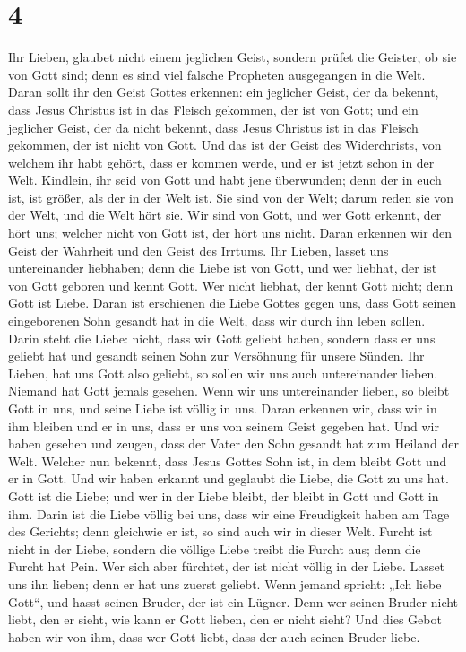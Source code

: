 \hypertarget{section-3}{%
\section{4}\label{section-3}}

 Ihr Lieben, glaubet nicht einem jeglichen Geist, sondern
prüfet die Geister, ob sie von Gott sind; denn es sind viel falsche
Propheten ausgegangen in die Welt.  Daran sollt ihr den
Geist Gottes erkennen: ein jeglicher Geist, der da bekennt, dass Jesus
Christus ist in das Fleisch gekommen, der ist von Gott; 
und ein jeglicher Geist, der da nicht bekennt, dass Jesus Christus ist
in das Fleisch gekommen, der ist nicht von Gott. Und das ist der Geist
des Widerchrists, von welchem ihr habt gehört, dass er kommen werde, und
er ist jetzt schon in der Welt.  Kindlein, ihr seid von
Gott und habt jene überwunden; denn der in euch ist, ist größer, als der
in der Welt ist.  Sie sind von der Welt; darum reden sie
von der Welt, und die Welt hört sie.  Wir sind von Gott,
und wer Gott erkennt, der hört uns; welcher nicht von Gott ist, der hört
uns nicht. Daran erkennen wir den Geist der Wahrheit und den Geist des
Irrtums.  Ihr Lieben, lasset uns untereinander liebhaben;
denn die Liebe ist von Gott, und wer liebhat, der ist von Gott geboren
und kennt Gott.  Wer nicht liebhat, der kennt Gott nicht;
denn Gott ist Liebe.  Daran ist erschienen die Liebe
Gottes gegen uns, dass Gott seinen eingeborenen Sohn gesandt hat in die
Welt, dass wir durch ihn leben sollen.  Darin steht die
Liebe: nicht, dass wir Gott geliebt haben, sondern dass er uns geliebt
hat und gesandt seinen Sohn zur Versöhnung für unsere Sünden.
 Ihr Lieben, hat uns Gott also geliebt, so sollen wir uns
auch untereinander lieben.  Niemand hat Gott jemals
gesehen. Wenn wir uns untereinander lieben, so bleibt Gott in uns, und
seine Liebe ist völlig in uns.  Daran erkennen wir, dass
wir in ihm bleiben und er in uns, dass er uns von seinem Geist gegeben
hat.  Und wir haben gesehen und zeugen, dass der Vater
den Sohn gesandt hat zum Heiland der Welt.  Welcher nun
bekennt, dass Jesus Gottes Sohn ist, in dem bleibt Gott und er in Gott.
 Und wir haben erkannt und geglaubt die Liebe, die Gott
zu uns hat. Gott ist die Liebe; und wer in der Liebe bleibt, der bleibt
in Gott und Gott in ihm.  Darin ist die Liebe völlig bei
uns, dass wir eine Freudigkeit haben am Tage des Gerichts; denn
gleichwie er ist, so sind auch wir in dieser Welt. 
Furcht ist nicht in der Liebe, sondern die völlige Liebe treibt die
Furcht aus; denn die Furcht hat Pein. Wer sich aber fürchtet, der ist
nicht völlig in der Liebe.  Lasset uns ihn lieben; denn
er hat uns zuerst geliebt.  Wenn jemand spricht: „Ich
liebe Gott``, und hasst seinen Bruder, der ist ein Lügner. Denn wer
seinen Bruder nicht liebt, den er sieht, wie kann er Gott lieben, den er
nicht sieht?  Und dies Gebot haben wir von ihm, dass wer
Gott liebt, dass der auch seinen Bruder liebe.

